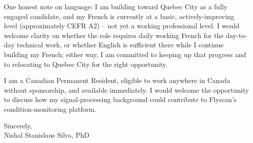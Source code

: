\documentclass[11pt]{article}
\begin{document}
One honest note on language: I am building toward Quebec City as a fully engaged candidate, and my French is currently at a basic, actively-improving level (approximately CEFR A2) -- not yet a working professional level. I would welcome clarity on whether the role requires daily working French for the day-to-day technical work, or whether English is sufficient there while I continue building my French; either way, I am committed to keeping up that progress and to relocating to Quebec City for the right opportunity.

I am a Canadian Permanent Resident, eligible to work anywhere in Canada without sponsorship, and available immediately. I would welcome the opportunity to discuss how my signal-processing background could contribute to Flyscan's condition-monitoring platform.

\vspace{1em}

Sincerely, \\
Nishal Stanislaus Silva, PhD
\end{document}

